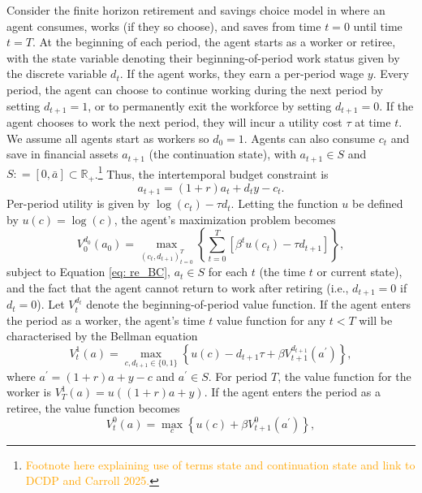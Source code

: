 \documentclass[12pt]{article}
\begin{document}
Consider the finite horizon retirement and savings choice model in \cite{Iskhakov2017} where an agent consumes, works (if they so choose), and saves from time $t=0$ until time $t=T$. At the beginning of each period, the agent starts as a worker or retiree, with the state variable denoting their beginning-of-period work status given by the discrete variable $d_{t}$. If the agent works, they earn a per-period wage $y$. Every period, the agent can choose to continue working during the next period by setting $d_{t+1} = 1$, or to permanently exit the workforce by setting $d_{t+1}=0$. If the agent chooses to work the next period, they will incur a utility cost $\tau$ at time $t$. We assume all agents start as workers so $d_{0} = 1$. Agents can also consume $c_{t}$ and save in financial assets $a_{t+1}$ (the continuation state), with $a_{t+1}\in S$ and $S\colon = \left[0,\bar{a}\right]\subset \mathbb{R}_{+}$.\footnote{\textcolor{orange}{Footnote here explaining use of terms state and continuation state and link to DCDP and Carroll 2025.}}  Thus, the intertemporal budget constraint is
%
\begin{equation}\label{eq: re_BC}
    a_{t+1} = (1+r)a_{t} + d_{t}y - c_{t}.
\end{equation}
%
Per-period utility is given by $\log(c_{t}) - \tau d_{t}$. Letting the function $u$ be defined by $u(c) = \log(c)$, the agent's maximization problem becomes
%
\begin{equation}
    V_{0}^{d_{0}}(a_{0}) = \max_{(c_{t},d_{t+1})_{t=0}^{T}}\left\{\sum_{t=0}^{T}\left[\beta^{t}u(c_{t}) - \tau d_{t+1}\right]\right\},
\end{equation}
%
subject to Equation \eqref{eq: re_BC}, $a_{t}\in S$ for each $t$ (the time $t$ or current state), and the fact that the agent cannot return to work after retiring (i.e., $d_{t+1} = 0$ if $d_{t} = 0$). Let $V_{t}^{d_{t}}$ denote the beginning-of-period value function. If the agent enters the period as a worker, the agent's time $t$ value function for any $t<T$ will be characterised by the Bellman equation
%
\begin{equation}\label{eq: bell1}
    V_{t}^{1}(a) = \max_{c,d_{t+1}\in \{0,1\}} \left\{u(c) - d_{t+1}\tau + \beta V_{t+1}^{d_{t+1}}(a^{\prime})\right\},
\end{equation}
%
where $a^{\prime} = (1+r)a + y - c$ and $a^{\prime}\in S$. For period $T$, the value function for the worker is $V_{T}^{1}(a) = u((1+r)a + y)$. If the agent enters the period as a retiree, the value function becomes
%
\begin{equation}
    V_{t}^{0}(a) = \max_{c} \left\{u(c) + \beta V_{t+1}^{0}(a^{\prime})\right\},
\end{equation}
\end{document}
